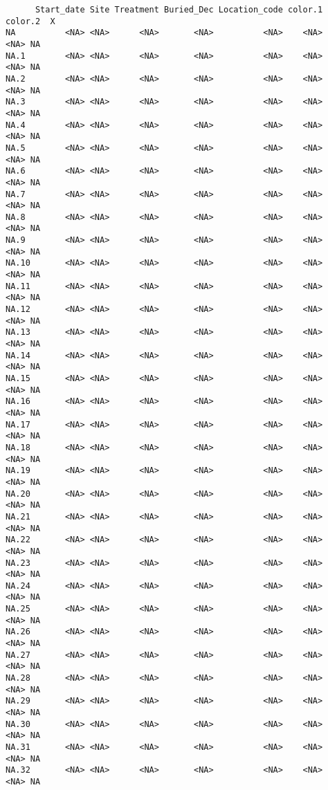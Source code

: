 \documentclass[
  letterpaper,
  DIV=11,
  numbers=noendperiod]{scrartcl}
\begin{document}
\begin{verbatim}
      Start_date Site Treatment Buried_Dec Location_code color.1 color.2  X
NA          <NA> <NA>      <NA>       <NA>          <NA>    <NA>    <NA> NA
NA.1        <NA> <NA>      <NA>       <NA>          <NA>    <NA>    <NA> NA
NA.2        <NA> <NA>      <NA>       <NA>          <NA>    <NA>    <NA> NA
NA.3        <NA> <NA>      <NA>       <NA>          <NA>    <NA>    <NA> NA
NA.4        <NA> <NA>      <NA>       <NA>          <NA>    <NA>    <NA> NA
NA.5        <NA> <NA>      <NA>       <NA>          <NA>    <NA>    <NA> NA
NA.6        <NA> <NA>      <NA>       <NA>          <NA>    <NA>    <NA> NA
NA.7        <NA> <NA>      <NA>       <NA>          <NA>    <NA>    <NA> NA
NA.8        <NA> <NA>      <NA>       <NA>          <NA>    <NA>    <NA> NA
NA.9        <NA> <NA>      <NA>       <NA>          <NA>    <NA>    <NA> NA
NA.10       <NA> <NA>      <NA>       <NA>          <NA>    <NA>    <NA> NA
NA.11       <NA> <NA>      <NA>       <NA>          <NA>    <NA>    <NA> NA
NA.12       <NA> <NA>      <NA>       <NA>          <NA>    <NA>    <NA> NA
NA.13       <NA> <NA>      <NA>       <NA>          <NA>    <NA>    <NA> NA
NA.14       <NA> <NA>      <NA>       <NA>          <NA>    <NA>    <NA> NA
NA.15       <NA> <NA>      <NA>       <NA>          <NA>    <NA>    <NA> NA
NA.16       <NA> <NA>      <NA>       <NA>          <NA>    <NA>    <NA> NA
NA.17       <NA> <NA>      <NA>       <NA>          <NA>    <NA>    <NA> NA
NA.18       <NA> <NA>      <NA>       <NA>          <NA>    <NA>    <NA> NA
NA.19       <NA> <NA>      <NA>       <NA>          <NA>    <NA>    <NA> NA
NA.20       <NA> <NA>      <NA>       <NA>          <NA>    <NA>    <NA> NA
NA.21       <NA> <NA>      <NA>       <NA>          <NA>    <NA>    <NA> NA
NA.22       <NA> <NA>      <NA>       <NA>          <NA>    <NA>    <NA> NA
NA.23       <NA> <NA>      <NA>       <NA>          <NA>    <NA>    <NA> NA
NA.24       <NA> <NA>      <NA>       <NA>          <NA>    <NA>    <NA> NA
NA.25       <NA> <NA>      <NA>       <NA>          <NA>    <NA>    <NA> NA
NA.26       <NA> <NA>      <NA>       <NA>          <NA>    <NA>    <NA> NA
NA.27       <NA> <NA>      <NA>       <NA>          <NA>    <NA>    <NA> NA
NA.28       <NA> <NA>      <NA>       <NA>          <NA>    <NA>    <NA> NA
NA.29       <NA> <NA>      <NA>       <NA>          <NA>    <NA>    <NA> NA
NA.30       <NA> <NA>      <NA>       <NA>          <NA>    <NA>    <NA> NA
NA.31       <NA> <NA>      <NA>       <NA>          <NA>    <NA>    <NA> NA
NA.32       <NA> <NA>      <NA>       <NA>          <NA>    <NA>    <NA> NA

\end{verbatim}
\end{document}
